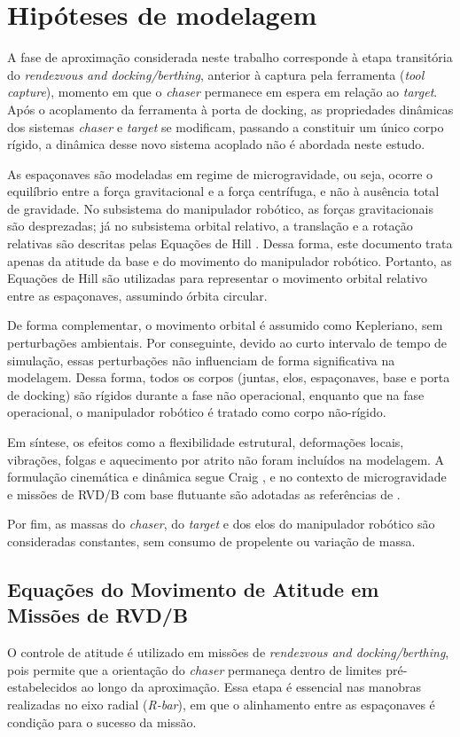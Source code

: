 \section{Hipóteses de modelagem}
A fase de aproximação considerada neste trabalho corresponde à etapa transitória do \emph{rendezvous and docking/berthing}, anterior à captura pela ferramenta (\emph{tool capture}), momento em que o \emph{chaser} permanece em espera em relação ao \emph{target}.
Após o acoplamento da ferramenta à porta de docking, as propriedades dinâmicas dos sistemas \emph{chaser} e \emph{target} se modificam, passando a constituir um único corpo rígido, a dinâmica desse novo sistema acoplado não é abordada neste estudo.

As espaçonaves são modeladas em regime de microgravidade, ou seja, ocorre o equilíbrio entre a força gravitacional e a força centrífuga, e não à ausência total de gravidade.
No subsistema do manipulador robótico, as forças gravitacionais são desprezadas; já no subsistema orbital relativo, a translação e a rotação relativas são descritas pelas Equações de Hill \cite{hill1878}. Dessa forma, este documento trata apenas da atitude da base e do movimento do manipulador robótico.
Portanto, as Equações de Hill são utilizadas para representar o movimento orbital relativo entre as espaçonaves, assumindo órbita circular.

De forma complementar, o movimento orbital é assumido como Kepleriano, sem perturbações ambientais.
Por conseguinte, devido ao curto intervalo de tempo de simulação, essas perturbações não influenciam de forma significativa na modelagem.
Dessa forma, todos os corpos (juntas, elos, espaçonaves, base e porta de docking) são rígidos durante a fase não operacional, enquanto que na fase operacional, o manipulador robótico é tratado como corpo não-rígido.  

Em síntese, os efeitos como a flexibilidade estrutural, deformações locais, vibrações, folgas e aquecimento por atrito não foram incluídos na modelagem.
A formulação cinemática e dinâmica segue Craig \cite{craig2005}, e no contexto de microgravidade e missões de RVD/B com base flutuante são adotadas as referências de \cite{fehse2003,wie2008space}.

Por fim, as massas do \emph{chaser}, do \emph{target} e dos elos do manipulador robótico são consideradas constantes, sem consumo de propelente ou variação de massa.

\subsection{Equações do Movimento de Atitude em Missões de RVD/B}
O controle de atitude é utilizado em missões de \emph{rendezvous and docking/berthing}, pois permite que a orientação do \emph{chaser} permaneça dentro de limites pré-estabelecidos ao longo da aproximação.
Essa etapa é essencial nas manobras realizadas no eixo radial (\emph{R-bar}), em que o alinhamento entre as espaçonaves é condição para o sucesso da missão.

